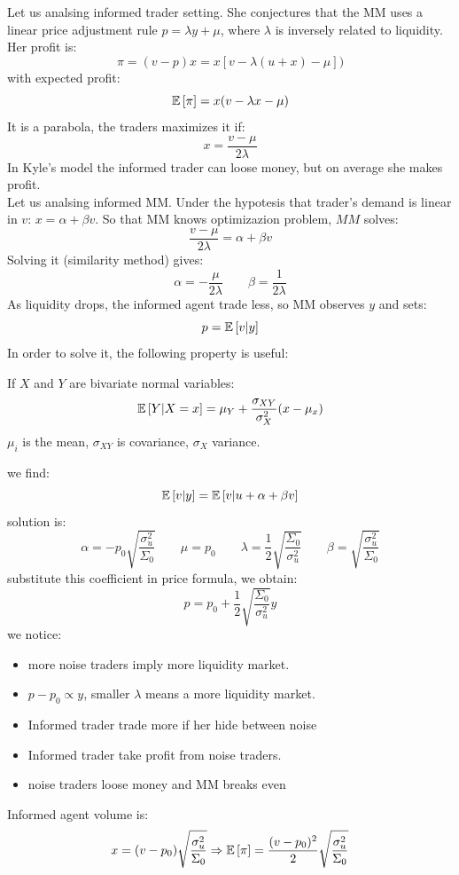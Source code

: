 Let us analsing informed trader setting. She conjectures that the MM uses a linear price adjustment rule $p = \lambda y + \mu$, where $\lambda$ is inversely related to liquidity. Her profit is:
\[
\pi = (v-p)x = x[v - \lambda(u+x) - \mu])
\]
with expected profit:
\[
\mathbb{E}\left[\pi\right] = x(v - \lambda x - \mu)
\]
It is a parabola, the traders maximizes it if:
\[
x = \frac{v - \mu}{2\lambda}
\]
In Kyle's model the informed trader can loose money, but on average she makes profit.\medskip \\
Let us analsing informed MM. Under the hypotesis that trader's demand is linear in $v$: $x = \alpha + \beta v$. So that MM knows optimizazion problem, $MM$ solves:
\[
\frac{v - \mu}{2\lambda} = \alpha + \beta v
\]
Solving it (similarity method) gives:
\[
\alpha = -\frac{\mu}{2\lambda} \qquad \beta = \frac{1}{2\lambda}
\]
As liquidity drops, the informed agent trade less, so MM observes $y$ and sets:
\[
p = \mathbb{E}\left[v|y\right]
\]
In order to solve it, the following property is useful:
\newpage
\begin{mytheorem}
	If $X$ and $Y$ are bivariate normal variables:
	\[
	\mathbb{E}\left[Y|X=x\right] = \mu_Y + \frac{\sigma_{XY}}{\sigma^2_X}(x - \mu_x)
	\]
	$\mu_i$ is the mean, $\sigma_{XY}$ is covariance, $\sigma_X$ variance.
\end{mytheorem}
we find:
\[
\mathbb{E}\left[v|y\right]= \mathbb{E}\left[v| u + \alpha + \beta v\right]
\]
solution is:
\[
\alpha = -p_0\sqrt{\frac{\sigma_u^2}{\Sigma_0}} \qquad \mu = p_0 \qquad \lambda = \frac{1}{2}\sqrt{\frac{\Sigma_0}{\sigma_u^2}} \qquad \beta = \sqrt{\frac{\sigma_u^2}{\Sigma_0}}
\]
substitute this coefficient in price formula, we obtain:
\begin{equation}
	p = p_0 + \frac{1}{2}\sqrt{\frac{\Sigma_0}{\sigma_u^2}}y
	\label{Kyle price}
\end{equation}
we notice:
\begin{itemize}
	\item more noise traders imply more liquidity market.
	\item $p-p_0 \propto y$, smaller $\lambda$ means a more liquidity market.
	\item Informed trader trade more if her hide between noise
	\item Informed trader take profit from noise traders.
	\item noise traders loose money and MM breaks even
\end{itemize}
Informed agent volume is:
\[
x = (v-p_0)\sqrt{\frac{\sigma_u^2}{\Sigma_0}} \Rightarrow \mathbb{E}\left[\pi\right] = \frac{(v - p_0)^2}{2}\sqrt{\frac{\sigma_u^2}{\Sigma_0}}
\]
